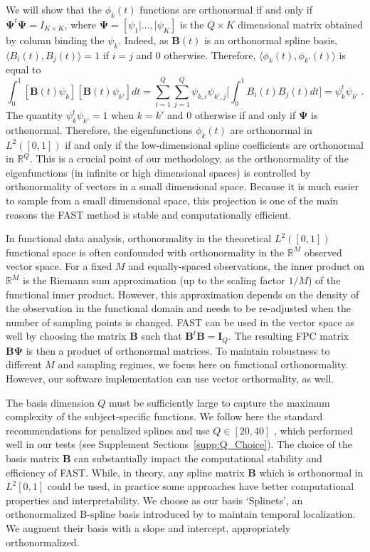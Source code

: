 \documentclass[12pt]{article}
\begin{document}
We will show that the $\phi_k(t)$ functions are orthonormal if and only if $\boldsymbol{\Psi}^t \boldsymbol{\Psi} = I_{K\times K}$, where $\mathbf{\Psi} = [\psi_1| \ldots, |\psi_K]$ is the $Q \times K$ dimensional matrix obtained by column binding the $\psi_k$. Indeed, as $\mathbf{B}(t)$ is an orthonormal spline basis, $\langle B_i(t), B_j(t)\rangle = 1$ if $i = j$ and $0$ otherwise. Therefore, $\langle \phi_k(t), \phi_{k'}(t) \rangle$ is equal to
\begin{equation*}
       \int_0^1 [\mathbf{B}(t)\psi_k][\mathbf{B}(t)\psi_{k'}] dt
     = \sum_{i = 1}^Q \sum_{j = 1}^Q \psi_{k,i} \psi_{k',j} \bigl[\int_0^1 B_i(t)B_j(t) dt \bigr] = \psi_{k}^t \psi_{k'}\;.
\end{equation*}
The quantity $\psi_{k}^t \psi_{k'} = 1$ when $k = k'$ and $0$ otherwise if and only if $\boldsymbol{\Psi}$ is orthonormal. Therefore, the eigenfunctions $\phi_k(t)$ are orthonormal in $L^2([0,1])$ if and only if the low-dimensional spline coefficients are orthonormal in $\mathbb{R}^Q$. This is a crucial point of our methodology, as the orthonormality of the eigenfunctions (in infinite or high dimensional spaces) is controlled by  orthonormality  of vectors in a small dimensional space. Because it is much easier to sample from a small dimensional space, this projection is one of the main reasons the FAST method is stable and computationally efficient.

In functional data analysis, orthonormality in the theoretical $L^2([0,1])$ functional space is often confounded with orthonormality in the  $\mathbb{R}^M$ observed vector space. For a fixed $M$ and equally-spaced observations, the inner product on $\mathbb{R}^M$ is the Riemann sum approximation (up to the scaling factor $1/M$) of the functional inner product. However, this approximation depends on the density of the observation in the functional domain  and needs to be re-adjusted when the number of sampling points is changed. FAST can be used in the vector space as well by choosing the  matrix $\mathbf{B}$ such that $\mathbf{B}^t \mathbf{B} = \mathbf{I}_Q$. The resulting FPC matrix $\mathbf{B}\boldsymbol{\Psi}$ is then a product of orthonormal matrices. To maintain robustness to different $M$ and sampling regimes, we focus here on functional orthonormality. However, our software implementation can use vector orthormality, as well.

The basis dimension $Q$ must be sufficiently large to capture the maximum complexity of the subject-specific functions. We follow here the standard recommendations for penalized splines and use $Q \in [20, 40]$ \citep{ruppert_selecting_2002}, which performed  well in our tests (see Supplement Sections~\ref{supp:Q_Choice}). The choice of the basis matrix $\mathbf{B}$ can substantially impact the computational stability and efficiency of FAST. While, in theory, any spline matrix $\mathbf{B}$ which is  orthonormal in $L^2[0,1]$ could be used, in practice some approaches have better computational properties and interpretability. We choose as our basis `Splinets', an orthonormalized B-spline basis introduced by \cite{liu_splinets_2020} to maintain temporal localization. We augment their basis with a slope and intercept, appropriately orthonormalized. 
\end{document}
